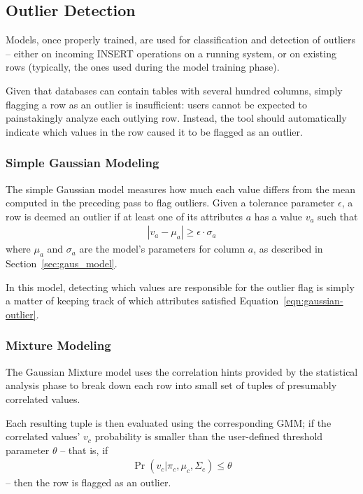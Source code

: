 \subsection{Outlier Detection}
\label{sec:outlier-detection}

Models, once properly trained, are used for classification and detection of outliers -- either on incoming INSERT operations on a running system, or on existing rows (typically, the ones used during the model training phase). %

Given that databases can contain tables with several hundred columns, simply flagging a row as an outlier is insufficient: users cannot be expected to painstakingly analyze each outlying row. Instead, the tool should automatically indicate which values in the row caused it to be flagged as an outlier.

\subsubsection{Simple Gaussian Modeling}
The simple Gaussian model measures how much each value differs from the mean computed in the preceding pass to flag outliers. Given a tolerance parameter $\epsilon$, a row is deemed an outlier if at least one of its attributes $a$ has a value $v_a$ such that 
\begin{align}
  |v_a - \mu_a| \ge \epsilon \cdot \sigma_a
  \label{eqn:gaussian-outlier}
\end{align}
where $\mu_a$ and $\sigma_a$ are the model's parameters for column $a$, as described in Section~\ref{sec:gaus_model}.

In this model, detecting which values are responsible for the outlier flag is simply a matter of keeping track of which attributes satisfied Equation~\ref{eqn:gaussian-outlier}.
 
\subsubsection{Mixture Modeling}
The Gaussian Mixture model uses the correlation hints provided by the statistical analysis phase to break down each row into small set of tuples of presumably correlated values.

Each resulting tuple is then evaluated using the corresponding GMM; if the correlated values' $v_c$ probability is smaller than the user-defined threshold parameter $\theta$ -- that is, if
\begin{align}
  \Pr(v_c | \pi_c, \mu_c, \Sigma_c) \leq \theta 
  \label{eqn:mixture-outlier}
\end{align}
 -- then the row is flagged as an outlier.

